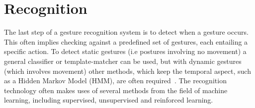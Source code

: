 \section{Recognition}
The last step of a gesture recognition system is to detect when a gesture occurs. This often implies checking against a predefined set of gestures, each entailing a specific action. To detect static gestures (i.e postures involving no movement) a general classifier or template-matcher can be used, but with dynamic gestures (which involves movement) other methods, which keep the temporal aspect, such as a Hidden Markov Model (HMM), are often required~\citep{Benton1995}. The recognition technology often makes uses of several methods from the field of machine learning, including supervised, unsupervised and reinforced learning.
